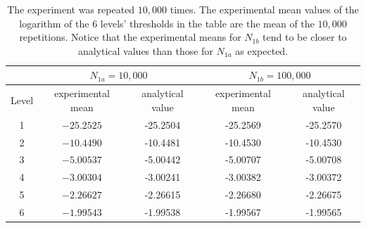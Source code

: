 \documentclass[letterpaper, preprint]{aastex}
\begin{document}
\clearpage

\begin{table}[h]
\centering
\begin{tabular}{c|c|c|c|c}
\hline
& \multicolumn{2}{|c|}{$N_{1a}=10,000$} & \multicolumn{2}{|c}{$N_{1b}=100,000$}\\
\hline
Level & experimental mean & analytical value & experimental mean & analytical value\\
\hline
1 & $-25.2525$ & -25.2504 &-25.2569 & -25.2570\\
2 & $-10.4490$ & -10.4481 &-10.4530 & -10.4530\\
3 & $-5.00537$ & -5.00442 &-5.00707 & -5.00708\\
4 & $-3.00304$ & -3.00241 &-3.00382 & -3.00372\\
5 & $-2.26627$ & -2.26615 &-2.26680 & -2.26675\\
6 & $-1.99543$ & -1.99538 &-1.99567 & -1.99565\\
\hline
\end{tabular}
\caption{The experiment was repeated $10,000$ times. The experimental mean values of the logarithm of the 6 levels' thresholds in the table are the mean of the $10,000$ repetitions. Notice that the experimental means for $N_{1b}$ tend to be closer to analytical values than those for $N_{1a}$ as expected.}
\label{tab:threshold-mean}
\end{table} 
\end{document}
